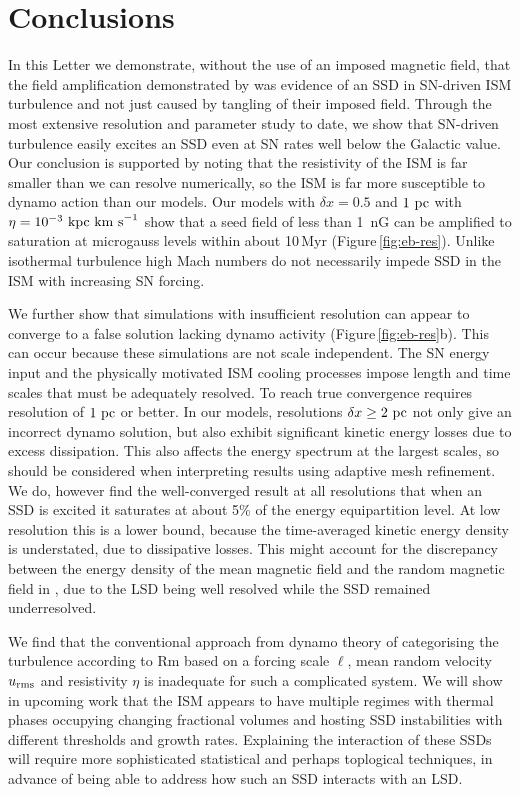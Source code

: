 \documentclass[preprint2]{aastex63}
\newcommand\kpc{~ {\rm kpc}}
\newcommand\pc{~ {\rm pc}}
\newcommand\dx{ {\delta x}}
\newcommand\kms{~ {\rm km~ s}^{-1}}
\begin{document}
\section{Conclusions}\label{sec:conc}

 In this Letter we demonstrate, without the use of an imposed magnetic field,
 that the field amplification demonstrated by \citet{BKMM04} was evidence of
 an SSD in SN-driven ISM turbulence and not just caused by tangling of their
 imposed field.
 Through the most extensive resolution and parameter study to date, we show
 that SN-driven turbulence easily excites an SSD even at SN rates well below the
 Galactic value.
 Our conclusion is supported by noting that the resistivity of the ISM is far
 smaller than we can resolve numerically, so the ISM is far more susceptible to
 dynamo action than our models.
 Our models with $\dx=0.5$ and $1\pc$ with $\eta=10^{-3}\kpc\kms$ show that a
 seed field of less than 1~nG can be amplified to saturation at microgauss
 levels within about 10\,Myr (Figure\,\ref{fig:eb-res}). 
 Unlike isothermal turbulence high Mach numbers do not necessarily impede SSD
 in the ISM with increasing SN forcing.

 We further show that simulations with insufficient resolution can appear to
 converge to a false solution lacking dynamo activity
 (Figure\,\ref{fig:eb-res}b). This can occur because these simulations are not
 scale independent. 
 The SN energy input and the physically motivated ISM cooling processes impose
 length and time scales that must be adequately resolved.
 To reach true convergence requires resolution of $1\pc$ or better.
 In our models, resolutions $\dx\geq2\pc$ not only give an incorrect dynamo
 solution, but also exhibit significant kinetic energy losses due to excess
 dissipation.
 This also affects the energy spectrum at the largest scales, so should be 
 considered when interpreting results using adaptive mesh refinement.
 We do, however find the well-converged result at all resolutions that when an
 SSD is excited it saturates at about 5\% of the energy equipartition level.
 At low resolution this is a lower bound, because the time-averaged kinetic
 energy density is understated, due to dissipative losses.
 This might account for the discrepancy between the energy density of the mean
 magnetic field and the random magnetic field in \citet{Gent:2013b}, due to the
 LSD being well resolved while the SSD remained underresolved.

 We find that the conventional approach from dynamo theory of categorising the 
 turbulence according to Rm based on a forcing scale $\ell$, mean random velocity
 $u_{\rm rms}$ and resistivity $\eta$ is inadequate for such a complicated
 system.
 We will show in upcoming work that the ISM appears to have multiple regimes
 with thermal phases occupying changing fractional volumes
 \citep[e.g.][]{gatto2015} and hosting SSD instabilities with different
 thresholds and growth rates.
 Explaining the interaction of these SSDs will require more sophisticated
 statistical and perhaps toplogical techniques, in advance of being able to 
 address how such an SSD interacts with an LSD.
\end{document}
